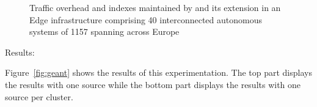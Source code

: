 \begin{asparadesc}
\begin{figure}
  \hspace{5pt}
  \caption{\label{fig:europe-ases}Traffic overhead and indexes
    maintained by \NAME and its extension \NAMEC in an Edge
    infrastructure comprising 40 interconnected autonomous systems of
    1157 \processes spanning across Europe~\cite{knight2011internet}}
\end{figure}



\item [Results:]

Figure~\ref{fig:geant} shows the results of this experimentation. The
top part displays the results with one source while the bottom part
displays the results with one source per cluster.


\end{asparadesc}
